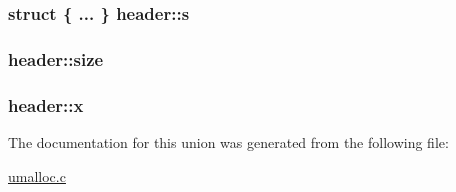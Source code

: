 \subsubsection[{\texorpdfstring{s}{s}}]{\setlength{\rightskip}{0pt plus 5cm}struct \{ ... \}   header\+::s}\hypertarget{unionheader_a3d684c1d6a9465b92eb26550d38ce659}{}\label{unionheader_a3d684c1d6a9465b92eb26550d38ce659}
\subsubsection[{\texorpdfstring{size}{size}}]{ header\+::size}\hypertarget{unionheader_a70db454b20b4a40995532b7ea029a527}{}\label{unionheader_a70db454b20b4a40995532b7ea029a527}
\subsubsection[{\texorpdfstring{x}{x}}]{ header\+::x}\hypertarget{unionheader_a2f321dbb657408f93d0c585f55951bdb}{}\label{unionheader_a2f321dbb657408f93d0c585f55951bdb}


The documentation for this union was generated from the following file\+:\begin{DoxyCompactItemize}
\item 
\hyperlink{umalloc_8c}{umalloc.\+c}\end{DoxyCompactItemize}

